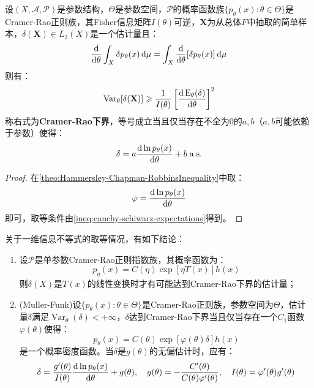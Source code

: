 \begin{theorem}
	\label{theo:InformationInequality1}
	设$(X,\mathscr{A},\mathscr{P})$是参数结构，$\Theta$是参数空间，$\mathscr{P}$的概率函数族$\{p_{\theta}(x):\theta\in\Theta\}$是Cramer-Rao正则族，其Fisher信息矩阵$I(\theta)$可逆，$\mathbf{X}$为从总体$F$中抽取的简单样本，$\delta(\mathbf{X})\in L_2(X)$是一个估计量且：
	\begin{equation*}
		\frac{\mathop{}\!\mathrm{d}}{\mathop{}\!\mathrm{d}\theta}\int_{X}\delta p_{\theta}(x)\mathop{}\!\mathrm{d}\mu=\int_{X}\frac{\mathop{}\!\mathrm{d}}{\mathop{}\!\mathrm{d}\theta}[\delta p_{\theta}(x)]\mathop{}\!\mathrm{d}\mu
	\end{equation*}
	则有：
	\begin{equation*}
		\operatorname{Var}_{\theta}[\delta(\mathbf{X})]\geqslant\frac{1}{I(\theta)}\left[\frac{\mathop{}\!\mathrm{d}\operatorname{E}_{\theta}(\delta)}{\mathop{}\!\mathrm{d}\theta}\right]^2
	\end{equation*}
	称右式为\textbf{Cramer-Rao下界}，等号成立当且仅当存在不全为$0$的$a,b$（$a,b$可能依赖于参数）使得：
	\begin{equation*}
		\delta=a\frac{\mathop{}\!\mathrm{d}\ln p_{\theta}(x)}{\mathop{}\!\mathrm{d}\theta}+b\;\text{a.s.}
	\end{equation*}
\end{theorem}
\begin{proof}
	在\cref{theo:Hammersley-Chapman-RobbinsInequality}中取：
	\begin{equation*}
		\varphi=\frac{\mathop{}\!\mathrm{d}\ln p_{\theta}(x)}{\mathop{}\!\mathrm{d}\theta}
	\end{equation*}
	即可，取等条件由\cref{ineq:cauchy-schiwarz-expectations}得到。
\end{proof}
\begin{theorem}
	关于一维信息不等式的取等情况，有如下结论：
	\begin{enumerate}
		\item 设$\mathscr{P}$是单参数Cramer-Rao正则指数族，其概率函数为：
		\begin{equation*}
			p_{\eta}(x)=C(\eta)\exp[\eta T(x)]h(x)
		\end{equation*}
		则$\delta(X)$是$T(x)$的线性变换时才有可能达到Cramer-Rao下界的估计量；
		\item (Muller-Funk)设$\{p_{\theta}(x):\theta\in\Theta\}$是Cramer-Rao正则族，参数空间为$\Theta$，估计量$\delta$满足$\operatorname{Var}_{\theta}(\delta)<+\infty$，$\delta$达到Cramer-Rao下界当且仅当存在一个$C_1$函数$\varphi(\theta)$使得：
		\begin{equation*}
			p_{\theta}(x)=C(\theta)\exp[\varphi(\theta)\delta]h(x)
		\end{equation*}
		是一个概率密度函数。当$\delta$是$g(\theta)$的无偏估计时，应有：
		\begin{equation*}
			\delta=\frac{g'(\theta)}{I(\theta)}\frac{\mathop{}\!\mathrm{d}\ln p_{\theta}(x)}{\mathop{}\!\mathrm{d}\theta}+g(\theta),\quad g(\theta)=-\frac{C'(\theta)}{C(\theta)\varphi'(\theta)},\quad I(\theta)=\varphi'(\theta)g'(\theta)
		\end{equation*}
	\end{enumerate}
\end{theorem}

